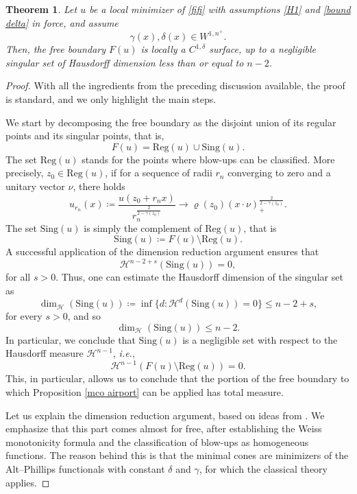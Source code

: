 \documentclass[reqno,11pt]{amsart}
\newtheorem{theorem}{Theorem}[section]
\newcommand{\sing}{\text{Sing}}
\newcommand{\reg}{\text{Reg}}
\newcommand{\1}{\mathds{1}}
\numberwithin{equation}{section}
\begin{document}
\begin{theorem}\label{free boundary regularity theorem}
Let $u$ be a local minimizer of \eqref{fifi} with assumptions \eqref{H1} and \eqref{bound delta} in force, and assume 
$$
    \gamma(x), \delta(x)  \in W^{1,n^{+}}.
$$
Then, the free boundary $F(u)$ is locally a $C^{1,\delta}$ surface, up to a negligible singular set of Hausdorff dimension less than or equal to $n-2$.
\end{theorem}

\begin{proof}
With all the ingredients from the preceding discussion available, the proof is standard, and we only highlight the main steps. 
    
We start by decomposing the free boundary as the disjoint union of its regular points and its singular points, that is,
$$
    F(u) = \reg(u) \cup \sing(u).
$$
The set $\reg(u)$ stands for the points where blow-ups can be classified. More precisely, $z_0 \in \reg(u)$, if for a sequence of radii $r_n$ converging to zero and a unitary vector $\nu$, there holds 
$$
     u_{r_n}(x) \coloneqq \frac{u(z_0 + r_nx)}{r_n^{\frac{2}{2-\gamma(z_0)}}} \longrightarrow \varrho(z_0) (x\cdot \nu)_{+}^{\frac{2}{2-\gamma(z_0)}}.
$$
The set $\sing(u)$ is simply the complement of $\reg(u)$, that is 
$$
    \sing(u) \coloneqq F(u) \setminus \reg(u).
$$
A successful application of the dimension reduction argument ensures that
$$
    \mathcal{H}^{n-2+s}(\sing(u)) = 0,
$$
for all $s>0$. Thus, one can estimate the Hausdorff dimension of the singular set as
$$
    \dim_\mathcal{H}\left(\sing(u)\right) \coloneqq \inf\{d: \mathcal{H}^d(\sing(u)) = 0  \} \leq n-2+s,
$$
for every $s>0$, and so
$$
    \dim_\mathcal{H}\left(\sing(u)\right) \leq n-2.
$$
In particular, we conclude that $\sing(u)$ is a negligible set with respect to the Hausdorff measure $\mathcal{H}^{n-1}$, \textit{i.e.}, 
$$
    \mathcal{H}^{n-1} \left (F(u) \setminus \reg(u) \right ) = 0.
$$
This, in particular, allows us to conclude that the portion of the free boundary to which Proposition \ref{mco airport} can be applied has total measure. 

Let us explain the dimension reduction argument, based on ideas from \cite{DSS2}. We emphasize that this part comes almost for free, after establishing the Weiss monotonicity formula and the classification of blow-ups as homogeneous functions. The reason behind this is that the minimal cones are minimizers of the Alt--Phillips functionals with constant $\delta$ and $\gamma$, for which the classical theory applies.


\end{proof}
\end{document}
